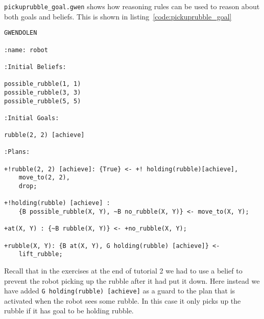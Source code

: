 \documentclass[a4]{article}
\begin{document}
\texttt{pickuprubble\_goal.gwen} shows how reasoning rules can be used to reason about both goals and beliefs.  This is shown in listing~\ref{code:pickuprubble_goal}
\begin{lstlisting}[float,caption=Pick Up Rubble (Goals in Guards),basicstyle=\sffamily,style=easslisting,language=Gwendolen,label=code:pickuprubble_goal]
GWENDOLEN

:name: robot

:Initial Beliefs:

possible_rubble(1, 1)
possible_rubble(3, 3)
possible_rubble(5, 5)

:Initial Goals:

rubble(2, 2) [achieve]

:Plans:

+!rubble(2, 2) [achieve]: {True} <- +! holding(rubble)[achieve],
    move_to(2, 2), 
    drop;

+!holding(rubble) [achieve] : 
    {B possible_rubble(X, Y), ~B no_rubble(X, Y)} <- move_to(X, Y);

+at(X, Y) : {~B rubble(X, Y)} <- +no_rubble(X, Y);

+rubble(X, Y): {B at(X, Y), G holding(rubble) [achieve]} <- 
    lift_rubble;
\end{lstlisting}
Recall that in the exercises at the end of tutorial 2 we had to use a belief to prevent the robot picking up the rubble after it had put it down.  Here instead we have added \lstinline{G holding(rubble) [achieve]} as a guard to the plan that is activated when the robot sees some rubble.  In this case it only picks up the rubble if it has goal to be holding rubble.
\end{document}
